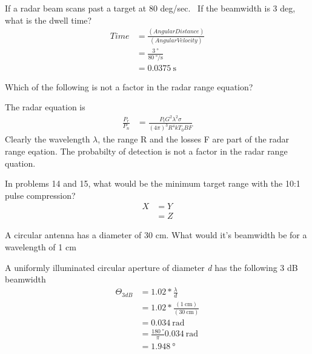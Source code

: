 \documentclass[12pt]{article}
\newenvironment{exercise}[2][Exercise]{\begin{trivlist}
    \item[\hskip \labelsep {\bfseries #1}\hskip \labelsep {\bfseries #2.}]}{\end{trivlist}}
\begin{document}
      \begin{exercise}{3}
      If a radar beam scans past a target at 80 deg/sec.  If the beamwidth is 3 deg, what is the dwell time?
      \begin{align*}
      Time & = \frac{(Angular Distance)}{(Angular Velocity)}\\
      & = \frac{\SI{3}{\degree}}{\SI{80}{\degree\per\second}}\\
      & = \SI{0.0375}{\second}
      \end{align*}      
      \end{exercise}

      \begin{exercise}{4}
      Which of the following is not a factor in the radar range equation?

      The radar equation is
      \begin{align*}
      \frac{P_{r}}{P_{n}} & = \frac{P_{t}G^{2}\lambda^{2}\sigma}{(4\pi)^{3}R^{4} k T_{0} B F}
      \end{align*}
      Clearly the wavelength $\lambda$, the range R and the losses F are part of the radar range eqation.  The probabilty of detection is not a factor in the radar range quation.
      \end{exercise}

      \begin{exercise}{5}
      In problems 14 and 15, what would be the minimum target range with the 10:1 pulse compression?
      \begin{align*}
      X & = Y\\
      & = Z
      \end{align*}
      \end{exercise}

      \begin{exercise}{6}
      A circular antenna has a diameter of 30 cm. What would it's beamwidth be for a wavelength of 1 cm 

      A uniformly illuminated circular aperture of diameter \textit{d} has the following 3 dB beamwidth
      \begin{align*}
      \Theta_{3 dB} & = 1.02 * \frac{\lambda}{d}\\
      & = 1.02 * \frac{(\SI{1}{\cm})}{(\SI{30}{\cm})}\\
      & = \SI{0.034}{\radian}\\
      & = \frac{\SI{180}{\degree}}{\pi}\SI{0.034}{\radian}\\
      & = \SI{1.948}{\degree}
      \end{align*}
      \end{exercise}
\end{document}
